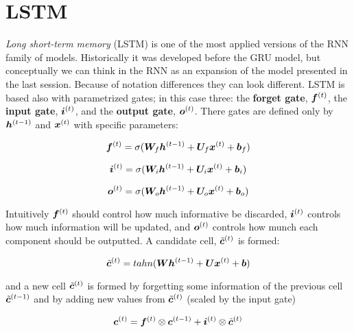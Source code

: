  

\section{LSTM}

\textit{Long short-term memory} (LSTM) is one of the most applied versions of the RNN family of models. Historically it was developed before the GRU model, but conceptually we can think in the RNN as an expansion of the model presented in the last session. Because of notation differences they can look different. LSTM is based also with parametrized gates; in this case three: the \textbf{forget gate}, $\bm{f}^{(t)}$, the \textbf{input gate}, $\bm{i}^{(t)}$, and the \textbf{output gate}, $\bm{o}^{(t)}$. There gates are defined only by $\bm{h}^{(t-1)}$ and $\bm{x}^{(t)}$ with specific parameters:

\begin{equation}
\bm{f}^{(t)} = \sigma(\bm{W}_{f} \bm{h}^{(t-1)} + \bm{U}_{f} \bm{x}^{(t)} + \bm{b}_{f})
\end{equation}

\begin{equation}
\bm{i}^{(t)} = \sigma(\bm{W}_{i} \bm{h}^{(t-1)} + \bm{U}_{i} \bm{x}^{(t)} + \bm{b}_{i})
\end{equation}

\begin{equation}
\bm{o}^{(t)} = \sigma(\bm{W}_{o} \bm{h}^{(t-1)} + \bm{U}_{o} \bm{x}^{(t)} + \bm{b}_{o})
\end{equation}

Intuitively $\bm{f}^{(t)}$ should control how much informative be discarded, $\bm{i}^{(t)}$ controls how much information will be updated, and $\bm{o}^{(t)}$ controls how munch each component should be outputted. A candidate cell, $\tilde{\bm{c}}^{(t)}$ is formed:

\begin{equation}
\tilde{\bm{c}}^{(t)} = tahn(\bm{W} \bm{h}^{(t-1)} + \bm{U} \bm{x}^{(t)} + \bm{b})
\end{equation}

and a new cell $\tilde{\bm{c}}^{(t)}$ is formed by forgetting some information of the previous cell $\tilde{\bm{c}}^{(t-1)}$ and by adding new values from $\tilde{\bm{c}}^{(t)}$ (scaled by the input gate)

\begin{equation}
\bm{c}^{(t)} = \bm{f}^{(t)} \otimes \bm{c}^{(t-1)} + \bm{i}^{(t)}\otimes \tilde{\bm{c}}^{(t)}
\end{equation}

